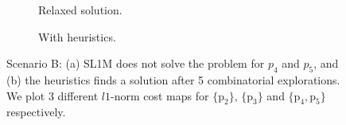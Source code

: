 \begin{figure}[h!]
\begin{subfigure}[t]{0.9\linewidth}
        \caption{Relaxed solution.}
        \label{fig:sl1m:final:0}
    \end{subfigure}
    \begin{subfigure}[t]{0.9\linewidth}
        \caption{With heuristics.}
        \label{fig:sl1m:final:1}
    \end{subfigure}
    \caption{Scenario B: (a) SL1M does not solve the problem for $p_4$ and $p_5$, and (b) the heuristics finds a solution after 5 combinatorial explorations. We plot 3 different $l1$-norm cost maps for $\{\mbox{p}_2\}$, $\{\mbox{p}_3\}$ and $\{\mbox{p}_4,\mbox{p}_5\}$ respectively.}
    \label{fig:sl1m:final}
\end{figure}


